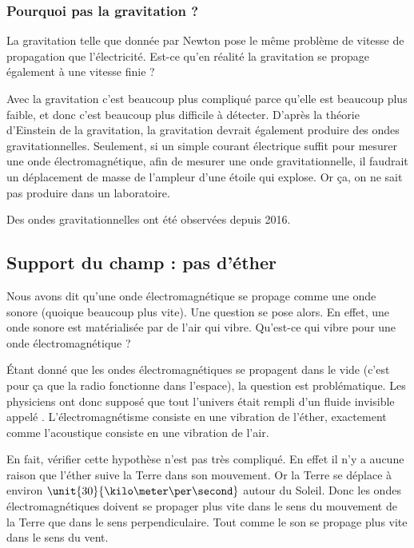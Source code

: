 \subsubsection{Pourquoi pas la gravitation ?}

La gravitation telle que donnée par Newton pose le même problème de vitesse de propagation que l'électricité. Est-ce qu'en réalité la gravitation se propage également à une vitesse finie ?

Avec la gravitation c'est beaucoup plus compliqué parce qu'elle est beaucoup plus faible, et donc c'est beaucoup plus difficile à détecter. D'après la théorie d'Einstein de la gravitation, la gravitation devrait également produire des ondes gravitationnelles. Seulement, si un simple courant électrique suffit pour mesurer une onde électromagnétique, afin de mesurer une onde gravitationnelle, il faudrait un déplacement de masse de l'ampleur d'une étoile qui explose. Or ça, on ne sait pas produire dans un laboratoire.

Des ondes gravitationnelles ont été observées depuis 2016\cite{BIBooAZZPooQvHWLV}.


\subsection{Support du champ : pas d'éther}

Nous avons dit qu'une onde électromagnétique se propage comme une onde sonore (quoique beaucoup plus vite). Une question se pose alors. En effet, une onde sonore est matérialisée par de l'air qui vibre. Qu'est-ce qui vibre pour une onde électromagnétique ?

Étant donné que les ondes électromagnétiques se propagent dans le vide (c'est pour ça que la radio fonctionne dans l'espace), la question est problématique. Les physiciens ont donc supposé que tout l'univers était rempli d'un fluide invisible appelé . L'électromagnétisme consiste en une vibration de l'éther, exactement comme l'acoustique consiste en une vibration de l'air.

En fait, vérifier cette hypothèse n'est pas très compliqué. En effet il n'y a aucune raison que l'éther suive la Terre dans son mouvement. Or la Terre se déplace à environ \( \unit{30}{\kilo\meter\per\second}\) autour du Soleil. Donc les ondes électromagnétiques doivent se propager plus vite dans le sens du mouvement de la Terre que dans le sens perpendiculaire. Tout comme le son se propage plus vite dans le sens du vent.

